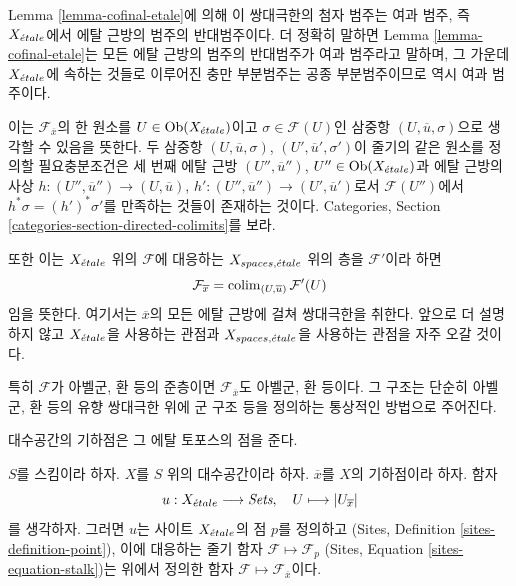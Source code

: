 \noindent
Lemma \ref{lemma-cofinal-etale}에 의해 이 쌍대극한의 첨자 범주는
여과 범주, 즉 $X_{\acute{e}tale}$에서 에탈 근방의 범주의 반대범주이다.
더 정확히 말하면 Lemma \ref{lemma-cofinal-etale}는 모든 에탈 근방의
범주의 반대범주가 여과 범주라고 말하며, 그 가운데
$X_{\acute{e}tale}$에 속하는 것들로 이루어진 충만 부분범주는 공종 부분범주이므로
역시 여과 범주이다.

\medskip\noindent
이는 $\mathcal{F}_{\overline{x}}$의 한 원소를
$U \in \mathop{\mathrm{Ob}}\nolimits(X_{\acute{e}tale})$이고 $\sigma \in \mathcal{F}(U)$인
삼중항 $(U, \overline{u}, \sigma)$으로 생각할 수 있음을 뜻한다.
두 삼중항 $(U, \overline{u}, \sigma)$,
$(U', \overline{u}', \sigma')$이 줄기의 같은 원소를 정의할
필요충분조건은 세 번째 에탈 근방
$(U'', \overline{u}'')$, $U'' \in \mathop{\mathrm{Ob}}\nolimits(X_{\acute{e}tale})$과
에탈 근방의 사상
$h : (U'', \overline{u}'') \to (U, \overline{u})$,
$h' : (U'', \overline{u}'') \to (U', \overline{u}')$로서
$\mathcal{F}(U'')$에서
$h^*\sigma = (h')^*\sigma'$를 만족하는 것들이 존재하는 것이다.
Categories, Section \ref{categories-section-directed-colimits}를 보라.

\medskip\noindent
또한 이는 $X_{\acute{e}tale}$ 위의 $\mathcal{F}$에 대응하는
$X_{spaces, {\acute{e}tale}}$ 위의 층을 $\mathcal{F}'$이라 하면
\begin{equation}
\label{equation-stalk-spaces-etale}
\mathcal{F}_{\overline{x}} = \mathop{\mathrm{colim}}\nolimits_{(U, \overline{u})} \mathcal{F}'(U)
\end{equation}
임을 뜻한다. 여기서는 $\overline{x}$의 모든 에탈 근방에 걸쳐
쌍대극한을 취한다. 앞으로 더 설명하지 않고 $X_{\acute{e}tale}$을 사용하는
관점과 $X_{spaces, {\acute{e}tale}}$을 사용하는 관점을 자주 오갈 것이다.

\medskip\noindent
특히 $\mathcal{F}$가 아벨군, 환 등의 준층이면
$\mathcal{F}_{\overline{x}}$도 아벨군, 환 등이다.
그 구조는 단순히 아벨군, 환 등의 유향 쌍대극한 위에 군 구조 등을
정의하는 통상적인 방법으로 주어진다.

\begin{lemma}
\label{lemma-stalk-gives-point}
\begin{slogan}
대수공간의 기하점은 그 에탈 토포스의 점을 준다.
\end{slogan}
$S$를 스킴이라 하자.
$X$를 $S$ 위의 대수공간이라 하자.
$\overline{x}$를 $X$의 기하점이라 하자.
함자
$$
u : X_{\acute{e}tale} \longrightarrow \textit{Sets}, \quad
U \longmapsto |U_{\overline{x}}|
$$
를 생각하자. 그러면 $u$는 사이트 $X_{\acute{e}tale}$의 점 $p$를 정의하고
(Sites, Definition \ref{sites-definition-point}),
이에 대응하는 줄기 함자
$\mathcal{F} \mapsto \mathcal{F}_p$
(Sites, Equation \ref{sites-equation-stalk})는 위에서 정의한 함자
$\mathcal{F} \mapsto \mathcal{F}_{\overline{x}}$이다.
\end{lemma}

